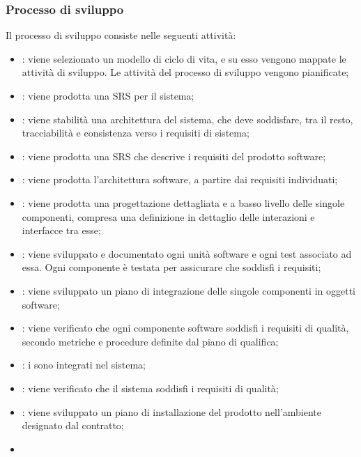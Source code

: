 \subsubsection{Processo di sviluppo}\label{development-process}

Il processo di sviluppo consiste nelle seguenti attività:

\begin{itemize}
  \item {}: viene selezionato un modello di
    ciclo di vita, e su esso vengono mappate le attività di sviluppo. Le
    attività del processo di sviluppo vengono pianificate;
  \item {}: viene prodotta una SRS per il
    sistema;
  \item {}: viene stabilità una architettura
     del sistema, che deve soddisfare, tra il resto,
    tracciabilità e consistenza verso i requisiti di sistema;
  \item {}: viene prodotta una SRS che
    descrive i requisiti del prodotto software;
  \item {}: viene prodotta l'architettura
    software, a partire dai requisiti individuati;
  \item {}: viene prodotta una progettazione
    dettagliata e a basso livello delle singole componenti, compresa una
    definizione in dettaglio delle interazioni e interfacce tra esse;
  \item {}: viene sviluppato e documentato
    ogni unità software e ogni test associato ad essa. Ogni componente è testata
    per assicurare che soddisfi i requisiti;
  \item {}: viene sviluppato un piano di integrazione delle
    singole componenti in oggetti software;
  \item {}:
    viene verificato che ogni componente software soddisfi i requisiti
    di qualità, secondo metriche e procedure definite dal piano di qualifica;
  \item {}: i  sono
    integrati nel sistema;
  \item {}:
    viene verificato che il sistema soddisfi i requisiti di qualità;
  \item {}: viene sviluppato un piano di installazione del
    prodotto nell'ambiente designato dal contratto;
  \item {}
\end{itemize}

